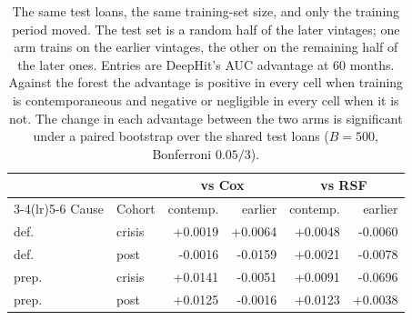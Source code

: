 \begin{table}[t]
\caption{The same test loans, the same training-set size, and only the training period moved. The test set is a random half of the later vintages; one arm trains on the earlier vintages, the other on the remaining half of the later ones. Entries are DeepHit's AUC advantage at 60 months. Against the forest the advantage is positive in every cell when training is contemporaneous and negative or negligible in every cell when it is not. The change in each advantage between the two arms is significant under a paired bootstrap over the shared test loans ($B=500$, Bonferroni $0.05/3$).}
\label{tab:matched}
\centering\footnotesize
\setlength{\tabcolsep}{4pt}
\begin{tabular}{@{}llrrrr@{}}
\toprule
& & \multicolumn{2}{c}{vs Cox} & \multicolumn{2}{c}{vs RSF} \\
\cmidrule(lr){3-4}\cmidrule(lr){5-6}
Cause & Cohort & contemp. & earlier & contemp. & earlier \\
\midrule
def. & crisis & +0.0019 & +0.0064 & +0.0048 & -0.0060 \\
def. & post & -0.0016 & -0.0159 & +0.0021 & -0.0078 \\
prep. & crisis & +0.0141 & -0.0051 & +0.0091 & -0.0696 \\
prep. & post & +0.0125 & -0.0016 & +0.0123 & +0.0038 \\
\bottomrule
\end{tabular}
\end{table}
